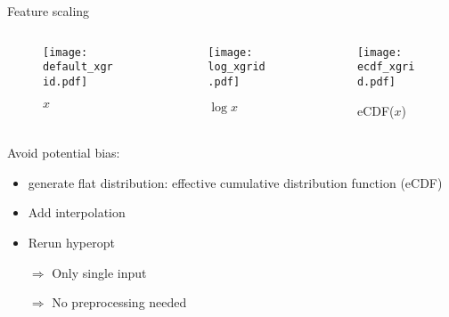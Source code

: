 \begin{frame}[t]{Feature scaling}
  \vspace*{-0.5cm}
  \begin{columns}
    \begin{column}{0.33\textwidth}
      \begin{figure}
        \texttt{[image: default\_xgrid.pdf]}
        \vspace*{-0.3cm}
        \caption*{$x$}
      \end{figure}
    \end{column}
    \begin{column}{0.33\textwidth}
      \begin{figure}
        \texttt{[image: log\_xgrid.pdf]}
        \vspace*{-0.3cm}
        \caption*{$\log x$}
      \end{figure}
    \end{column}
    \begin{column}{0.33\textwidth}
      \begin{figure}
        \texttt{[image: ecdf\_xgrid.pdf]}
        \vspace*{-0.3cm}
        \caption*{eCDF($x$)}
      \end{figure}
    \end{column}
  \end{columns}

  Avoid potential bias:
  \begin{itemize}
    \item generate flat distribution: effective cumulative distribution function (eCDF)
    \item Add interpolation
    \item Rerun hyperopt
    \item[$\Rightarrow$] Only single input
    \item[$\Rightarrow$] No preprocessing needed
  \end{itemize}

\end{frame}



